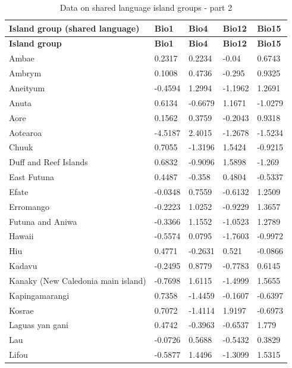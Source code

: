 \documentclass[a4paper,10pt]{article} %
\begin{document}
\begin{landscape}
\begin{longtable}{| p{2.6cm} |  p{2cm} | p{2cm}  | p{2cm}  | p{2cm}|}

\caption{{Data on shared language island groups - part 2}} 
\label{shared_language_groups_table_2} \\
\hline
\textbf{Island group (shared language)} & \textbf{Bio1} & \textbf{Bio4} & \textbf{Bio12} & \textbf{Bio15} \\ \hline

\endfirsthead

\hline
\textbf{Island group} & \textbf{Bio1} & \textbf{Bio4} & \textbf{Bio12} & \textbf{Bio15} \\ \hline
\endhead
Ambae&0.2317&0.2234&-0.04&0.6743\\ \hline
Ambrym&0.1008&0.4736&-0.295&0.9325\\ \hline
Aneityum&-0.4594&1.2994&-1.1962&1.2691\\ \hline
Anuta&0.6134&-0.6679&1.1671&-1.0279\\ \hline
Aore&0.1562&0.3759&-0.2043&0.9318\\ \hline
Aotearoa&-4.5187&2.4015&-1.2678&-1.5234\\ \hline
Chuuk&0.7055&-1.3196&1.5424&-0.9215\\ \hline
Duff and Reef Islands&0.6832&-0.9096&1.5898&-1.269\\ \hline
East Futuna&0.4487&-0.358&0.4804&-0.5337\\ \hline
Efate&-0.0348&0.7559&-0.6132&1.2509\\ \hline
Erromango&-0.2223&1.0252&-0.9229&1.3657\\ \hline
Futuna and Aniwa&-0.3366&1.1552&-1.0523&1.2789\\ \hline
Hawaii&-0.5574&0.0795&-1.7603&-0.9972\\ \hline
Hiu&0.4771&-0.2631&0.521&-0.0866\\ \hline
Kadavu&-0.2495&0.8779&-0.7783&0.6145\\ \hline
Kanaky (New Caledonia main island)&-0.7698&1.6115&-1.4999&1.5655\\ \hline
Kapingamarangi&0.7358&-1.4459&-0.1607&-0.6397\\ \hline
Kosrae&0.7072&-1.4114&1.9197&-0.6973\\ \hline
Laguas yan gani&0.4742&-0.3963&-0.6537&1.779\\ \hline
Lau&-0.0726&0.5688&-0.5432&0.3829\\ \hline
Lifou&-0.5877&1.4496&-1.3099&1.5315\\ \hline

\end{longtable}
\end{landscape}
\end{document}
